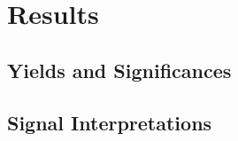 \chapter{Results}
\label{ch:results}

\section{Yields and Significances}
\label{sec:yields}

\section{Signal Interpretations}
\label{sec:interpretations}
